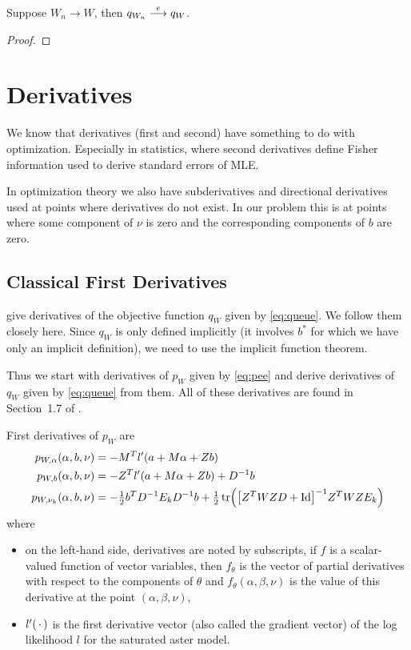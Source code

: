 \begin{theorem} \label{th:queue-epi}
Suppose $W_n \to W$, then $q_{W_n} \stackrel{e}{\longrightarrow} q_{W}$.
\end{theorem}
\begin{proof}
\end{proof}

\section{Derivatives}

We know that derivatives (first and second) have something to do with
optimization.  Especially in statistics, where second derivatives define
Fisher information used to derive standard errors of MLE.

In optimization theory we also have subderivatives and directional derivatives
used at points where derivatives do not exist.  In our problem this is
at points where some component of $\nu$ is zero and the corresponding
components of $b$ are zero.

\subsection{Classical First Derivatives}
\label{sec:first-derivatives}

\citet{reaster-tr,reaster} give derivatives of the objective function $q_W$
given by \eqref{eq:queue}.  We follow them closely here.  Since
$q_W$ is only defined implicitly (it involves $b^*$ for which we have only
an implicit definition), we need to use the implicit function theorem.

Thus we start with derivatives of $p_W$ given by \eqref{eq:pee} and
derive derivatives of $q_W$ given by \eqref{eq:queue} from them.
All of these derivatives are found in Section~1.7 of \citet{reaster-tr}.

First derivatives of $p_W$ are
\begin{subequations}
\begin{align}
   p_{W, \alpha}(\alpha, b, \nu)
   & =
   - M^T l'(a + M \alpha + Z b)
   \label{eq:p-alpha}
   \\
   p_{W, b}(\alpha, b, \nu)
   & =
   - Z^T l'(a + M \alpha + Z b) + D^{- 1} b
   \label{eq:p-bee}
   \\
   p_{W, \nu_k}(\alpha, b, \nu)
   & =
   - \tfrac{1}{2} b^T D^{- 1} E_k D^{- 1} b
   + \tfrac{1}{2} \operatorname{tr} \Bigl(
   \bigl[ Z^T W Z D + \text{Id} \bigr]^{- 1}
   Z^T W Z E_k
   \Bigr)
   \label{eq:p-nu-k}
\end{align}
\end{subequations}
where
\begin{itemize}
\item on the left-hand side, derivatives are noted by subscripts,
    if $f$ is a scalar-valued function
    of vector variables, then $f_\theta$ is the vector of partial derivatives
    with respect to the components of $\theta$
    and $f_\theta(\alpha, \beta, \nu)$ is the
    value of this derivative at the point $(\alpha, \beta, \nu)$,
\item $l'(\,\cdot\,)$ is the first derivative vector (also called the
    gradient vector) of the log likelihood $l$ for the saturated aster
    model.
\end{itemize}

